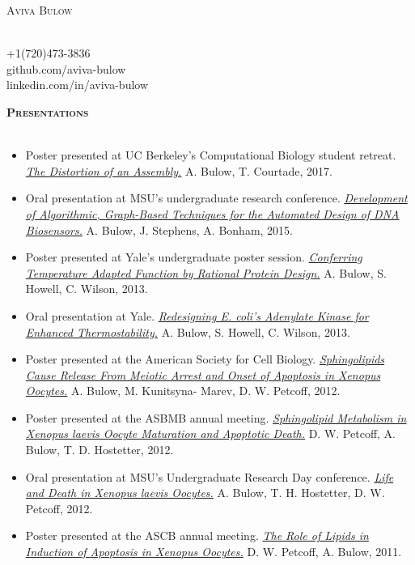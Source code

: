 \documentclass{article}
\newcommand{\lineunder}{\vspace*{-8pt} \\ \hspace*{-18pt} \hrulefill \\}
\newcommand{\header}[1]{{\vspace*{8pt}\hspace*{-16pt} \textsc{\textbf{\large{#1}}}} \vspace*{4pt} \lineunder \vspace*{4pt}}
\newcommand{\contact}[5]{
\begin{multicols}{2}
    \raggedcolumns
    \begin{flushleft}
    { \Huge \scshape {#1}}\\
    \end{flushleft}
    
\columnbreak

    \begin{flushright}
    #2 \\ #3 \\
    #4 \\ #5 \\
    \end{flushright}

\end{multicols}

}
\begin{document}
\newpage

\contact{\huge{Aviva Bulow}}{}{+1(720)473-3836}{github.com/aviva-bulow}{linkedin.com/in/aviva-bulow}

\vspace{-10pt}


\vspace{-10pt}
\header{Presentations}
\begin{itemize}
    \item Poster presented at UC Berkeley’s Computational Biology student retreat. \href{https://drive.google.com/file/d/1KP7PMcwjiTxELFN4eLtC5HGHk9OF8_WL/view?usp=sharing}{\emph{The Distortion of an Assembly.}} A. Bulow, T. Courtade, 2017.
    
    \item Oral presentation at MSU's undergraduate research conference. \href{https://drive.google.com/open?id=1Qp-pwFFNq9W6Y1yXco7bPYb9gR42gzD2}{\emph{Development of Algorithmic, Graph-Based Techniques for the Automated Design of DNA Biosensors.}} A. Bulow, J. Stephens, A. Bonham, 2015.
    
    \item Poster presented at Yale's undergraduate poster session. \href{https://drive.google.com/open?id=1Nw7wZhaQDygO1d3IZz-vhO8EmXwR53my}{\emph{Conferring Temperature Adapted Function by Rational Protein Design.}} A. Bulow, S. Howell, C. Wilson, 2013.
    
    \item Oral presentation at Yale. \href{https://drive.google.com/open?id=1sF4QX-CQlN3W_EaFlgoVAvbmasgJ1z5q}{\emph{Redesigning E. coli's Adenylate Kinase for Enhanced Thermostability.}} A. Bulow, S. Howell, C. Wilson, 2013.
    
    \item Poster presented at the American Society for Cell Biology. \href{https://drive.google.com/open?id=1Vq4hbrAPjBWLphlA4Se0KVR6hjOEQe-S}{\emph{Sphingolipids Cause Release From Meiotic Arrest and Onset of Apoptosis in Xenopus Oocytes.}} A. Bulow, M. Kunitsyna-	Marev, D. W. Petcoff, 2012.
    
    \item Poster presented at the ASBMB annual meeting. \href{https://drive.google.com/open?id=13EF6xDcyMrBdnJIrP-nvODf55aXsTH6-}{\emph{Sphingolipid Metabolism in Xenopus laevis Oocyte Maturation and Apoptotic Death.}} D. W. Petcoff, A. Bulow, T. D. Hostetter, 2012.
    
    \item Oral presentation at MSU's Undergraduate Research Day conference. \href{https://drive.google.com/open?id=1ln5oxNm-i0YR0fhrTjiymTV8P7ksthtm}{\emph{Life and Death in Xenopus laevis Oocytes.}} A. Bulow, T. H. Hostetter, D. W. Petcoff, 2012.
    
    \item Poster presented at the ASCB annual meeting. \href{https://drive.google.com/open?id=1WiOZdf3LeyTG-4txPeANV7zDjhcjQIQ5}{\emph{The Role of Lipids in Induction of Apoptosis in Xenopus Oocytes.}} D. W. Petcoff, A. Bulow, 2011.
    

\end{itemize}
\end{document}
